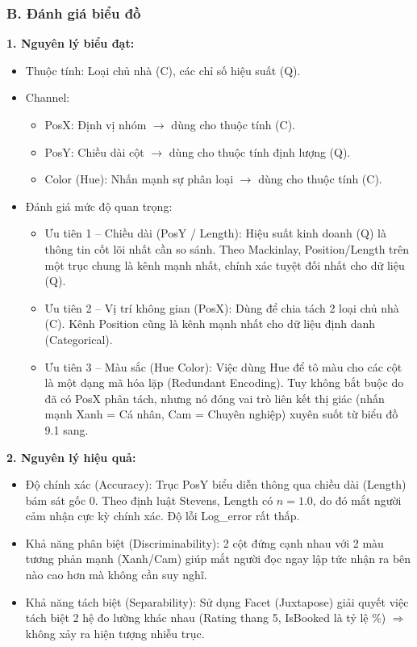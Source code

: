 \subsubsection*{B. Đánh giá biểu đồ}

\textbf{1. Nguyên lý biểu đạt:}

\begin{itemize}
    \item Thuộc tính: Loại chủ nhà (C), các chỉ số hiệu suất (Q).
    \item Channel:
    \begin{itemize}
        \item PosX: Định vị nhóm $\rightarrow$ dùng cho thuộc tính (C).
        \item PosY: Chiều dài cột $\rightarrow$ dùng cho thuộc tính định lượng (Q).
        \item Color (Hue): Nhấn mạnh sự phân loại $\rightarrow$ dùng cho thuộc tính (C).
    \end{itemize}
    \item Đánh giá mức độ quan trọng:
    \begin{itemize}
        \item Ưu tiên 1 -- Chiều dài (PosY / Length): Hiệu suất kinh doanh (Q) là thông tin cốt lõi nhất cần so sánh. Theo Mackinlay, Position/Length trên một trục chung là kênh mạnh nhất, chính xác tuyệt đối nhất cho dữ liệu (Q).
        \item Ưu tiên 2 -- Vị trí không gian (PosX): Dùng để chia tách 2 loại chủ nhà (C). Kênh Position cũng là kênh mạnh nhất cho dữ liệu định danh (Categorical).
        \item Ưu tiên 3 -- Màu sắc (Hue Color): Việc dùng Hue để tô màu cho các cột là một dạng mã hóa lặp (Redundant Encoding). Tuy không bắt buộc do đã có PosX phân tách, nhưng nó đóng vai trò liên kết thị giác (nhấn mạnh Xanh = Cá nhân, Cam = Chuyên nghiệp) xuyên suốt từ biểu đồ 9.1 sang.
    \end{itemize}
\end{itemize}

\textbf{2. Nguyên lý hiệu quả:}

\begin{itemize}
    \item Độ chính xác (Accuracy): Trục PosY biểu diễn thông qua chiều dài (Length) bám sát gốc 0. Theo định luật Stevens, Length có $n = 1.0$, do đó mắt người cảm nhận cực kỳ chính xác. Độ lỗi Log\_error rất thấp.
    \item Khả năng phân biệt (Discriminability): 2 cột đứng cạnh nhau với 2 màu tương phản mạnh (Xanh/Cam) giúp mắt người đọc ngay lập tức nhận ra bên nào cao hơn mà không cần suy nghĩ.
    \item Khả năng tách biệt (Separability): Sử dụng Facet (Juxtapose) giải quyết việc tách biệt 2 hệ đo lường khác nhau (Rating thang 5, IsBooked là tỷ lệ \%) $\Rightarrow$ không xảy ra hiện tượng nhiễu trục.
\end{itemize}

